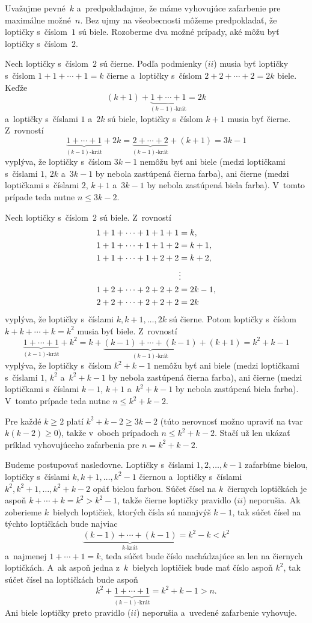 {%
Uvažujme pevné~$k$ a~predpokladajme, že máme vyhovujúce zafarbenie pre maximálne možné~$n$. Bez ujmy na všeobecnosti môžeme predpokladať, že loptičky s~číslom~$1$ sú biele. Rozoberme dva možné prípady, aké môžu byť loptičky s~číslom~$2$.

Nech loptičky s~číslom~$2$ sú čierne. Podľa podmienky ($ii$) musia byť loptičky s~číslom $1+1+\cdots+1=k$ čierne a~loptičky s~číslom $2+2+\cdots+2=2k$ biele. Keďže
$$
(k+1)+\underbrace{1+\cdots+1}_{\text{$(k-1)$-krát}}=2k
$$
a~loptičky s~číslami $1$ a~$2k$ sú biele, loptičky s~číslom $k+1$ musia byť čierne. Z~rovností
$$
\underbrace{1+\cdots+1}_{\text{$(k-1)$-krát}}+2k=\underbrace{2+\cdots+2}_{\text{$(k-1)$-krát}}+(k+1)=3k-1
$$
vyplýva, že loptičky s~číslom $3k-1$ nemôžu byť ani biele (medzi loptičkami s~číslami $1$, $2k$ a~$3k-1$ by nebola zastúpená čierna farba), ani čierne (medzi loptičkami s~číslami $2$, $k+1$ a~$3k-1$ by nebola zastúpená biela farba). V~tomto prípade teda nutne $n\le 3k-2$.

Nech loptičky s~číslom~$2$ sú biele. Z~rovností
$$
\aligned
1+1+\cdots+1+1+1&=k,\\
1+1+\cdots+1+1+2&=k+1,\\
1+1+\cdots+1+2+2&=k+2,\\
&\vdots\\
1+2+\cdots+2+2+2&=2k-1,\\
2+2+\cdots+2+2+2&=2k
\endaligned
$$
vyplýva, že loptičky s~číslami $k,k+1,\dots,2k$ sú čierne. Potom loptičky s~číslom $k+k+\cdots+k=k^2$ musia byť biele. Z~rovností
$$
\underbrace{1+\cdots+1}_{\text{$(k-1)$-krát}}+k^2=k+\underbrace{(k-1)+\cdots+(k-1)}_{\text{$(k-1)$-krát}}+(k+1)=k^2+k-1
$$
vyplýva, že loptičky s~číslom $k^2+k-1$ nemôžu byť ani biele (medzi loptičkami s~číslami $1$, $k^2$ a~$k^2+k-1$ by nebola zastúpená čierna farba), ani čierne (medzi loptičkami s~číslami $k-1$, $k+1$ a~$k^2+k-1$ by nebola zastúpená biela farba). V~tomto prípade teda nutne $n\le k^2+k-2$.

\smallskip
Pre každé $k\ge2$ platí $k^2+k-2\ge 3k-2$ (túto nerovnosť možno upraviť na tvar $k(k-2)\ge0$), takže v~oboch prípadoch $n\le k^2+k-2$. Stačí už len ukázať príklad vyhovujúceho zafarbenia pre $n=k^2+k-2$.

Budeme postupovať nasledovne. Loptičky s~číslami $1,2,\dots,k-1$ zafarbíme bielou, loptičky s~číslami $k,k+1,\dots,k^2-1$ čiernou a~loptičky s~číslami $k^2,k^2+1,\dots,k^2+k-2$ opäť bielou farbou. Súčet čísel na $k$~čiernych loptičkách je aspoň $k+\cdots+k=k^2>k^2-1$, takže čierne loptičky pravidlo ($ii$) neporušia. Ak zoberieme $k$~bielych loptičiek, ktorých čísla sú nanajvýš $k-1$, tak súčet čísel na týchto loptičkách bude najviac
$$
\underbrace{(k-1)+\cdots+(k-1)}_{\text{$k$-krát}}=k^2-k<k^2
$$
a~najmenej $1+\cdots+1=k$, teda súčet bude číslo nachádzajúce sa len na čiernych loptičkách. A~ak aspoň jedna z~$k$~bielych loptičiek bude mať číslo aspoň $k^2$, tak súčet čísel na loptičkách bude aspoň
$$
k^2+\underbrace{1+\cdots+1}_{\text{$(k-1)$-krát}}=k^2+k-1>n.
$$
Ani biele loptičky preto pravidlo ($ii$) neporušia a~uvedené zafarbenie vyhovuje.
}

